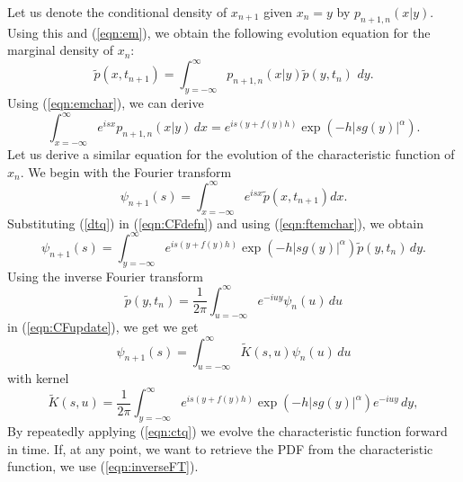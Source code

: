 \documentclass[12pt]{l4dc2021}
\begin{document}
Let us denote the conditional density of $x_{n+1}$ given $x_n = y$ by $p_{n+1, n}(x | y)$.  Using this and (\ref{eqn:em}), we obtain the following evolution equation for the marginal density of $x_n$:
\begin{equation}
\label{dtq}
\widetilde{p}(x, t_{n+1})=\int_{y=-\infty}^{\infty} p_{n+1, n}(x | y ) \widetilde{p}(y, t_n) \, \, dy.
\end{equation}
Using (\ref{eqn:emchar}), we can derive
\begin{equation}
\label{eqn:ftemchar}
\int_{x=-\infty}^\infty e^{i s x} p_{n+1, n}(x | y) \, dx = e^{is \left(y+ f(y)h \right)}\exp (- h |s g(y)|^{\alpha} ).
\end{equation}
Let us derive a similar equation for the evolution of the characteristic function of $x_n$.  We begin with the Fourier transform
\begin{equation}
\label{eqn:CFdefn}
\psi_{n+1}(s) = \int_{x=-\infty}^{\infty}e^{isx}\widetilde{p}(x,t_{n+1})dx.
\end{equation}
Substituting (\ref{dtq}) in (\ref{eqn:CFdefn}) and using (\ref{eqn:ftemchar}), we obtain
\begin{equation}
\label{eqn:CFupdate}
\psi_{n+1}(s) = \int_{y=-\infty}^{\infty}e^{is\left(y+f(y)h\right)}\exp{\left(  -h |s g(y)|^{\alpha} \right)}\widetilde{p}(y, t_n) \, dy.
\end{equation}
Using the inverse Fourier transform
\begin{equation}
\label{eqn:inverseFT}
\widetilde{p}(y, t_n) = \frac{1}{2\pi}\int_{u=-\infty}^{\infty}e^{-iuy}\psi_{n}(u)\, du
\end{equation}
in (\ref{eqn:CFupdate}), we get
we get
\begin{equation}
\label{eqn:ctq}
\psi_{n+1}(s) =  \int_{u=-\infty}^{\infty}\widetilde{K}(s,u)\psi_{n}(u) \, du
\end{equation}
with kernel
\begin{equation}
\label{eqn:kdef}
\widetilde{K}(s,u) = \frac{1}{2\pi}\int_{y=-\infty}^{\infty}e^{is\left(y+f(y)h\right)}\exp{\left(  -h |s g(y)|^{\alpha} \right)}e^{-iuy}\, dy,
\end{equation}
By repeatedly applying (\ref{eqn:ctq}) we evolve the characteristic function forward in time.  If, at any point, we want to retrieve the PDF from the characteristic function, we use (\ref{eqn:inverseFT}).
\end{document}
